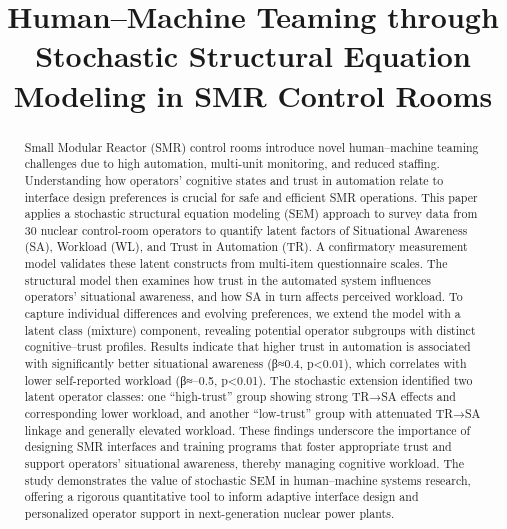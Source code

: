 \documentclass[conference]{IEEEtran}
\begin{document}
\title{ Human–Machine Teaming through Stochastic Structural Equation Modeling in SMR Control Rooms}

\author{
}

\maketitle

\begin{abstract}
Small Modular Reactor (SMR) control rooms introduce novel human–machine teaming challenges due to high automation, multi-unit monitoring, and reduced staffing. Understanding how operators’ cognitive states and trust in automation relate to interface design preferences is crucial for safe and efficient SMR operations. This paper applies a stochastic structural equation modeling (SEM) approach to survey data from 30 nuclear control-room operators to quantify latent factors of Situational Awareness (SA), Workload (WL), and Trust in Automation (TR). A confirmatory measurement model validates these latent constructs from multi-item questionnaire scales. The structural model then examines how trust in the automated system influences operators’ situational awareness, and how SA in turn affects perceived workload. To capture individual differences and evolving preferences, we extend the model with a latent class (mixture) component, revealing potential operator subgroups with distinct cognitive–trust profiles. Results indicate that higher trust in automation is associated with significantly better situational awareness (β≈0.4, p<0.01), which correlates with lower self-reported workload (β≈–0.5, p<0.01). The stochastic extension identified two latent operator classes: one “high-trust” group showing strong TR→SA effects and corresponding lower workload, and another “low-trust” group with attenuated TR→SA linkage and generally elevated workload. These findings underscore the importance of designing SMR interfaces and training programs that foster appropriate trust and support operators’ situational awareness, thereby managing cognitive workload. The study demonstrates the value of stochastic SEM in human–machine systems research, offering a rigorous quantitative tool to inform adaptive interface design and personalized operator support in next-generation nuclear power plants.
\end{abstract}
\end{document}
